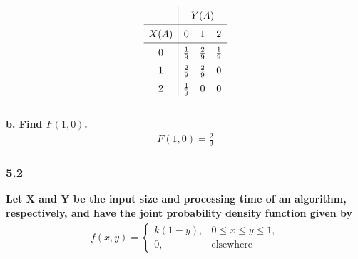 \documentclass[
	a4paper, %
	10pt, %
	unnumberedsections, %
	twoside, %
]{LTJournalArticle}
\begin{document}
\begin{equation*}
    \renewcommand{\arraystretch}{1.5}
    \begin{array}{c|ccc}
        & \multicolumn{3}{c}{Y(A)} \\ \hline
        X(A) & 0 & 1 & 2 \\ \hline
        0 & \frac{1}{9} & \frac{2}{9} & \frac{1}{9} \\
        1 & \frac{2}{9} & \frac{2}{9} & 0 \\
        2 & \frac{1}{9} & 0 & 0
    \end{array}
    \renewcommand{\arraystretch}{1}
\end{equation*} \\

\textbf{b. Find $F(1, 0)$.}
\begin{equation*}
    \begin{aligned}
        F(1, 0) = \frac{2}{9}
    \end{aligned}
\end{equation*}
\vspace*{1pt}\noindent
\subsubsection{5.2}
\textbf{Let X and Y be the input size and processing time of an algorithm, respectively, and have the joint probability density function given by} \\
\begin{equation*}
    \begin{aligned}
        f(x, y) =
        \begin{cases}
            k(1 - y), & 0 \le x \le y \le 1, \\
            0, & \text{elsewhere}
        \end{cases}
    \end{aligned}
\end{equation*}
\end{document}

